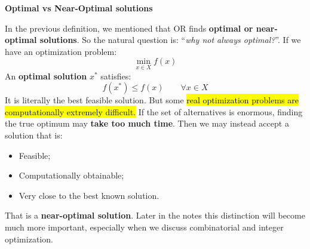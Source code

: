\highspace
\begin{flushleft}
    \textcolor{Green3}{ \textbf{Optimal vs Near-Optimal solutions}}
\end{flushleft}
In the previous definition, we mentioned that OR finds \textbf{optimal or near-optimal solutions}. So the natural question is: ``\emph{why not always optimal?}''. If we have an optimization problem:
\begin{equation*}
    \min_{x\in X} f(x)
\end{equation*}
An \textbf{optimal solution} $x^*$ satisfies:
\begin{equation*}
    f(x^*)\leq f(x) \qquad \forall x\in X
\end{equation*}
It is literally the best feasible solution. But some \hl{real optimization problems are computationally extremely difficult.} If the set of alternatives is enormous, finding the true optimum may \textbf{take too much time}. Then we may instead accept a solution that is:
\begin{itemize}
    \item Feasible;
    \item Computationally obtainable;
    \item Very close to the best known solution.
\end{itemize}
That is a \textbf{near-optimal solution}. Later in the notes this distinction will become much more important, especially when we discuss combinatorial and integer optimization.

